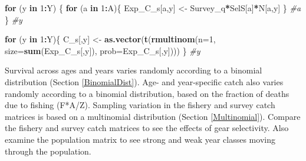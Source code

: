 \documentclass[
]{krantz}
\makeatletter
\newenvironment{Shaded}{\begin{snugshade}}{\end{snugshade}}
\newcommand{\AttributeTok}[1]{\textcolor[rgb]{0.27,0.27,0.27}{#1}}
\newcommand{\CommentTok}[1]{\textcolor[rgb]{0.37,0.37,0.37}{\textit{#1}}}
\newcommand{\ControlFlowTok}[1]{\textcolor[rgb]{0.27,0.27,0.27}{\textbf{#1}}}
\newcommand{\DecValTok}[1]{\textcolor[rgb]{0.06,0.06,0.06}{#1}}
\newcommand{\FunctionTok}[1]{\textcolor[rgb]{0.27,0.27,0.27}{\textbf{#1}}}
\newcommand{\NormalTok}[1]{#1}
\newcommand{\OtherTok}[1]{\textcolor[rgb]{0.37,0.37,0.37}{#1}}
\newcommand{\SpecialCharTok}[1]{\textcolor[rgb]{0.43,0.43,0.43}{\textbf{#1}}}
\newenvironment{kframe}{%
\medskip{}
\setlength{\fboxsep}{.8em}
 \def\at@end@of@kframe{}%
 \ifinner\ifhmode%
  \def\at@end@of@kframe{\end{minipage}}%
  \begin{minipage}{\columnwidth}%
 \fi\fi%
 \def\FrameCommand##1{\hskip\@totalleftmargin \hskip-\fboxsep
 \colorbox{shadecolor}{##1}\hskip-\fboxsep
     \hskip-\linewidth \hskip-\@totalleftmargin \hskip\columnwidth}%
 \MakeFramed {\advance\hsize-\width
   \@totalleftmargin\z@ \linewidth\hsize
   \@setminipage}}%
 {\par\unskip\endMakeFramed%
 \at@end@of@kframe}
\renewenvironment{Shaded}{\begin{kframe}}{\end{kframe}}
\makeatother
\begin{document}
\begin{Shaded}
\begin{Highlighting}[]
\ControlFlowTok{for}\NormalTok{ (y }\ControlFlowTok{in} \DecValTok{1}\SpecialCharTok{:}\NormalTok{Y) \{}
  \ControlFlowTok{for}\NormalTok{ (a }\ControlFlowTok{in} \DecValTok{1}\SpecialCharTok{:}\NormalTok{A)\{}
\NormalTok{    Exp\_C\_s[a,y] }\OtherTok{\textless{}{-}}\NormalTok{ Survey\_q}\SpecialCharTok{*}\NormalTok{SelS[a]}\SpecialCharTok{*}\NormalTok{N[a,y]}
\NormalTok{  \} }\CommentTok{\#a}
\NormalTok{\} }\CommentTok{\#y }

\ControlFlowTok{for}\NormalTok{ (y }\ControlFlowTok{in} \DecValTok{1}\SpecialCharTok{:}\NormalTok{Y)\{}
\NormalTok{  C\_s[,y] }\OtherTok{\textless{}{-}} \FunctionTok{as.vector}\NormalTok{(}\FunctionTok{t}\NormalTok{(}\FunctionTok{rmultinom}\NormalTok{(}\AttributeTok{n=}\DecValTok{1}\NormalTok{, }\AttributeTok{size=}\FunctionTok{sum}\NormalTok{(Exp\_C\_s[,y]), }
                                   \AttributeTok{prob=}\NormalTok{Exp\_C\_s[,y])))}
\NormalTok{  \} }\CommentTok{\#y}
\end{Highlighting}
\end{Shaded}

Survival across ages and years varies randomly according to a binomial distribution (Section \ref{BinomialDist}). Age- and year-specific catch also varies randomly according to a binomial distribution, based on the fraction of deaths due to fishing (F*A/Z). Sampling variation in the fishery and survey catch matrices is based on a multinomial distribution  (Section \ref{Multinomial}). Compare the fishery and survey catch matrices to see the effects of gear selectivity. Also examine the population matrix to see strong and weak year classes moving through the population.
\end{document}
